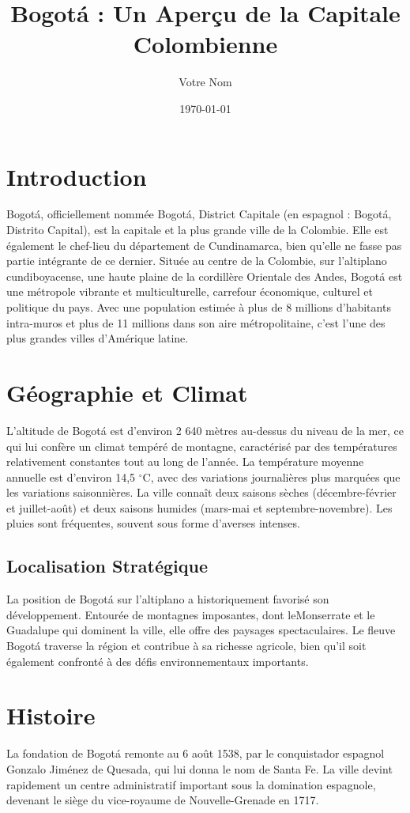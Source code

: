\documentclass{article}
\title{Bogotá : Un Aperçu
 de la Capitale Colombienne}
\author{Votre Nom}
\date{\today}
\begin{document}
\maketitle

\section{Introduction}
Bogotá, officiellement nommée Bogotá, District Capitale (en espagnol : Bogotá, Distrito Capital), est la capitale et la plus grande ville de la Colombie. Elle est également le chef-lieu du département de Cundinamarca, bien qu'elle ne fasse pas partie intégrante de ce dernier. Située au centre de la Colombie, sur l'altiplano cundiboyacense, une haute plaine de la cordillère Orientale des Andes, Bogotá est une métropole vibrante et multiculturelle, carrefour économique, culturel et politique du pays. Avec une population estimée à plus de 8 millions d'habitants intra-muros et plus de 11 millions dans son aire métropolitaine, c'est l'une des plus grandes villes d'Amérique latine.

\section{Géographie et Climat}
L'altitude de Bogotá est d'environ 2 640 mètres au-dessus du niveau de la mer, ce qui lui confère un climat tempéré de montagne, caractérisé par des températures relativement constantes tout au long de l'année. La température moyenne annuelle est d'environ 14,5 $^\circ$C, avec des variations journalières plus marquées que les variations saisonnières. La ville connaît deux saisons sèches (décembre-février et juillet-août) et deux saisons humides (mars-mai et septembre-novembre). Les pluies sont fréquentes, souvent sous forme d'averses intenses.

\subsection{Localisation Stratégique}
La position de Bogotá sur l'altiplano a historiquement favorisé son développement. Entourée de montagnes imposantes, dont leMonserrate et le Guadalupe qui dominent la ville, elle offre des paysages spectaculaires. Le fleuve Bogotá traverse la région et contribue à sa richesse agricole, bien qu'il soit également confronté à des défis environnementaux importants.

\section{Histoire}
La fondation de Bogotá remonte au 6 août 1538, par le conquistador espagnol Gonzalo Jiménez de Quesada, qui lui donna le nom de Santa Fe. La ville devint rapidement un centre administratif important sous la domination espagnole, devenant le siège du vice-royaume de Nouvelle-Grenade en 1717.
\end{document}
